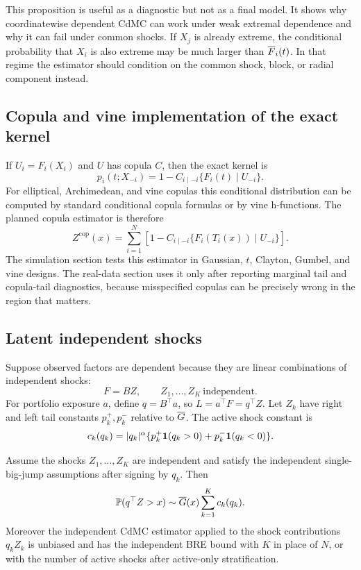 This proposition is useful as a diagnostic but not as a final model. It shows
why coordinatewise dependent CdMC can work under weak extremal dependence and
why it can fail under common shocks. If \(X_j\) is already extreme, the
conditional probability that \(X_i\) is also extreme may be much larger than
\(\overline{F}_i(t)\). In that regime the estimator should condition on the common shock,
block, or radial component instead.

\subsection{Copula and vine implementation of the exact kernel}

If \(U_i=F_i(X_i)\) and \(U\) has copula \(C\), then the exact kernel is
\[
  p_i(t;X_{-i})
  =1-C_{i\mid -i}\{F_i(t)\mid U_{-i}\}.
\]
For elliptical, Archimedean, and vine copulas this conditional distribution can
be computed by standard conditional copula formulas or by vine h-functions.
The planned copula estimator is therefore
\[
  Z^{\mathrm{cop}}(x)=\sum_{i=1}^N
  \left[1-C_{i\mid -i}\{F_i(T_i(x))\mid U_{-i}\}\right].
\]
The simulation section tests this estimator in Gaussian, \(t\), Clayton,
Gumbel, and vine designs. The real-data section uses it only after reporting
marginal tail and copula-tail diagnostics, because misspecified copulas can be
precisely wrong in the region that matters.

\subsection{Latent independent shocks}

Suppose observed factors are dependent because they are linear combinations of
independent shocks:
\[
  F=BZ, \qquad Z_1,\ldots,Z_K\ \text{independent}.
\]
For portfolio exposure \(a\), define \(q=B^\top a\), so \(L=a^\top F=q^\top Z\).
Let \(Z_k\) have right and left tail constants \(p_k^+,p_k^-\) relative to
\(\overline{G}\). The active shock constant is
\[
  c_k(q_k)=|q_k|^\alpha\{p_k^+\mathbf{1}(q_k>0)+p_k^-\mathbf{1}(q_k<0)\}.
\]

\begin{theorem}
\label{thm:latent-shock-tail}
Assume the shocks \(Z_1,\ldots,Z_K\) are independent and satisfy the
independent single-big-jump assumptions after signing by \(q_k\). Then
\[
  \mathbb{P}(q^\top Z>x)
  \sim \overline{G}(x)\sum_{k=1}^K c_k(q_k).
\]
Moreover the independent CdMC estimator applied to the shock contributions
\(q_kZ_k\) is unbiased and has the independent BRE bound with \(K\) in place of
\(N\), or with the number of active shocks after active-only stratification.
\end{theorem}

